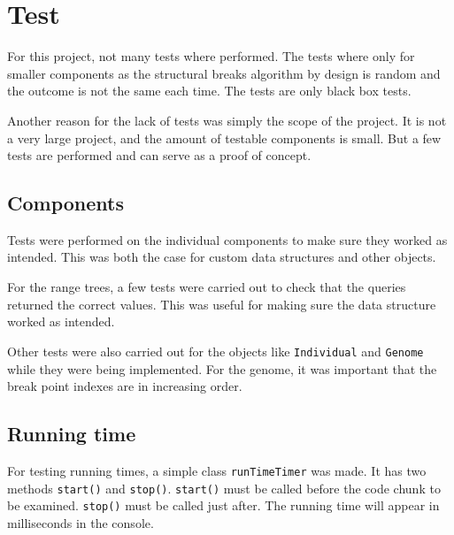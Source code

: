 
\section{Test} \label{sec:test}

For this project, not many tests where performed. The tests where only for
smaller components as the structural breaks algorithm by design is random and
the outcome is not the same each time. The tests are only black box tests. 

Another reason for the lack of tests was simply the scope of the project. It is
not a very large project, and the amount of testable components is small. But a
few tests are performed and can serve as a proof of concept. 

\subsection{Components}

Tests were performed on the individual components to make sure they worked as
intended. This was both the case for custom data structures and other objects. 

For the range trees, a few tests were carried out to check that the queries
returned the correct values. This was useful for making sure the data
structure worked as intended.  

Other tests were also carried out for the objects like \texttt{Individual} and
\texttt{Genome} while they were being implemented. For the genome, it was
important that the break point indexes are in increasing order. 

\subsection{Running time} \label{sec:test-running-time}

For testing running times, a simple class \texttt{runTimeTimer} was made. It has
two methods \texttt{start()} and \texttt{stop()}. \texttt{start()} must be called
before the code chunk to be examined. \texttt{stop()} must be called just after.
The running time will appear in milliseconds in the console. 

